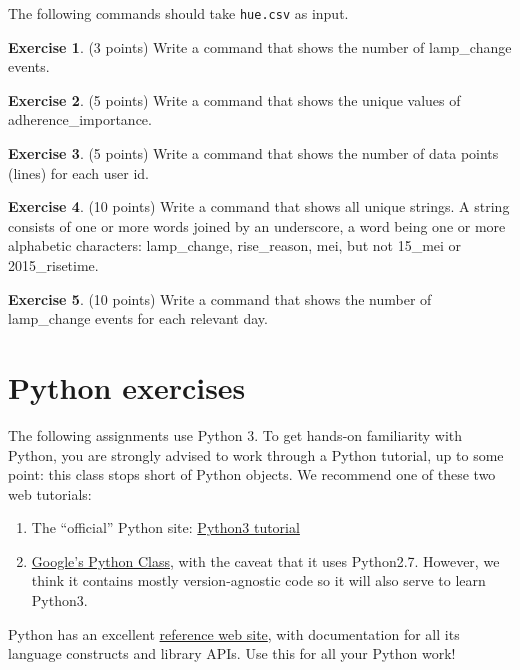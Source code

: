 \documentclass[a4paper]{report}
\theoremstyle{definition}
\newtheorem{exercise}{Exercise}
\begin{document}
\noindent The following commands should take \texttt{hue.csv} as input.

\begin{exercise}
	(3 points) Write a command that shows the number of lamp\_change events.
\end{exercise}

\begin{exercise}
	(5 points) Write a command that shows the unique values of adherence\_importance.
\end{exercise}

\begin{exercise}
	(5 points) Write a command that shows the number of data points (lines) for each
	user id.
\end{exercise}

\begin{exercise}
	(10 points) Write a command that shows all unique strings. A string consists of one or more words joined by an underscore, a word being
	one or more alphabetic characters: lamp\_change, rise\_reason, mei, but not 15\_mei or 2015\_risetime.
\end{exercise}

\begin{exercise}
	(10 points) Write a command that shows the number of lamp\_change events for each relevant day.
\end{exercise}


\section*{Python exercises}
\label{python-exercises}
The following assignments use Python 3. To get hands-on familiarity with Python, you are strongly advised to work through a Python tutorial, up to some point: this class stops short of Python objects. We recommend one of these two web tutorials:
\begin{enumerate}
	\setlength\itemsep{1mm}
	\item The ``official'' Python site: \href{https://docs.python.org/3/tutorial}{Python3 tutorial}
	\item \href{https://developers.google.com/edu/python/}{Google's Python Class}, with the caveat that it uses Python2.7. However, we think it contains	mostly version-agnostic code so it will also serve to learn Python3.
\end{enumerate}

\noindent Python has an excellent \href{https://docs.python.org/3/}{reference web site}, with documentation for all its language
constructs and library APIs. Use this for all your Python work!
\end{document}
